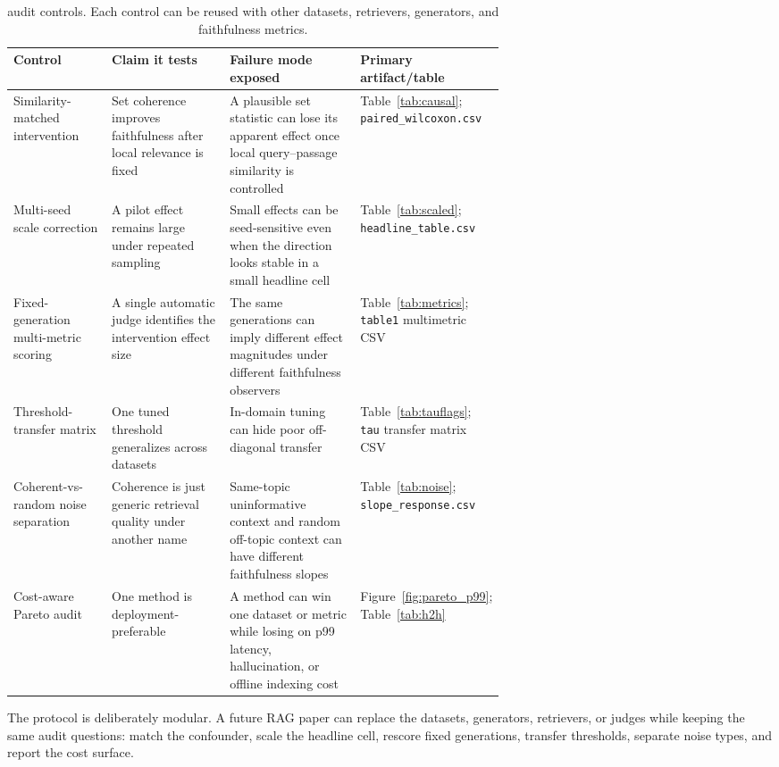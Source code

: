 \begin{table}[H]
\centering
\footnotesize
\caption{\method{} audit controls. Each control can be reused with other
datasets, retrievers, generators, and faithfulness metrics.}
\label{tab:controlledrag_protocol}
\begin{tabularx}{\linewidth}{p{0.20\linewidth}p{0.24\linewidth}Xp{0.20\linewidth}}
\toprule
Control & Claim it tests & Failure mode exposed & Primary artifact/table \\
\midrule
Similarity-matched intervention & Set coherence improves faithfulness after
local relevance is fixed & A plausible set statistic can lose its apparent
effect once local query--passage similarity is controlled & Table~\ref{tab:causal};
\texttt{paired\_wilcoxon.csv} \\
Multi-seed scale correction & A pilot effect remains large under repeated
sampling & Small effects can be seed-sensitive even when the direction looks
stable in a small headline cell & Table~\ref{tab:scaled};
\texttt{headline\_table.csv} \\
Fixed-generation multi-metric scoring & A single automatic judge identifies the
intervention effect size & The same generations can imply different effect
magnitudes under different faithfulness observers & Table~\ref{tab:metrics};
\texttt{table1} multimetric CSV \\
Threshold-transfer matrix & One tuned threshold generalizes across datasets &
In-domain tuning can hide poor off-diagonal transfer & Table~\ref{tab:tauflags};
\texttt{tau} transfer matrix CSV \\
Coherent-vs-random noise separation & Coherence is just generic retrieval
quality under another name & Same-topic uninformative context and random
off-topic context can have different faithfulness slopes & Table~\ref{tab:noise};
\texttt{slope\_response.csv} \\
Cost-aware Pareto audit & One method is deployment-preferable & A method can
win one dataset or metric while losing on p99 latency, hallucination, or
offline indexing cost & Figure~\ref{fig:pareto_p99};
Table~\ref{tab:h2h} \\
\bottomrule
\end{tabularx}
\end{table}

The protocol is deliberately modular. A future RAG paper can replace the
datasets, generators, retrievers, or judges while keeping the same audit
questions: match the confounder, scale the headline cell, rescore fixed
generations, transfer thresholds, separate noise types, and report the cost
surface.
